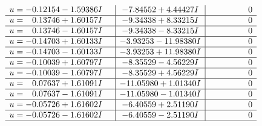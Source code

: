 \documentclass[1p]{elsarticle_modified}
\theoremstyle{definition}
\begin{document}
$$\begin{array}{c|c|c}
\begin{aligned}
u &= -0.12154 - 1.59386 I\end{aligned}
 & -7.84552 + 4.44427 I & \phantom{-0.000000 } 0 \\ \hline\begin{aligned}
u &= \phantom{-}0.13746 + 1.60157 I\end{aligned}
 & -9.34338 + 8.33215 I & \phantom{-0.000000 } 0 \\ \hline\begin{aligned}
u &= \phantom{-}0.13746 - 1.60157 I\end{aligned}
 & -9.34338 - 8.33215 I & \phantom{-0.000000 } 0 \\ \hline\begin{aligned}
u &= -0.14703 + 1.60133 I\end{aligned}
 & -3.93253 - 11.98380 I & \phantom{-0.000000 } 0 \\ \hline\begin{aligned}
u &= -0.14703 - 1.60133 I\end{aligned}
 & -3.93253 + 11.98380 I & \phantom{-0.000000 } 0 \\ \hline\begin{aligned}
u &= -0.10039 + 1.60797 I\end{aligned}
 & -8.35529 - 4.56229 I & \phantom{-0.000000 } 0 \\ \hline\begin{aligned}
u &= -0.10039 - 1.60797 I\end{aligned}
 & -8.35529 + 4.56229 I & \phantom{-0.000000 } 0 \\ \hline\begin{aligned}
u &= \phantom{-}0.07637 + 1.61091 I\end{aligned}
 & -11.05980 + 1.01340 I & \phantom{-0.000000 } 0 \\ \hline\begin{aligned}
u &= \phantom{-}0.07637 - 1.61091 I\end{aligned}
 & -11.05980 - 1.01340 I & \phantom{-0.000000 } 0 \\ \hline\begin{aligned}
u &= -0.05726 + 1.61602 I\end{aligned}
 & -6.40559 + 2.51190 I & \phantom{-0.000000 } 0 \\ \hline\begin{aligned}
u &= -0.05726 - 1.61602 I\end{aligned}
 & -6.40559 - 2.51190 I & \phantom{-0.000000 } 0\\
 \hline 
 \end{array}$$\newpage
\end{document}
